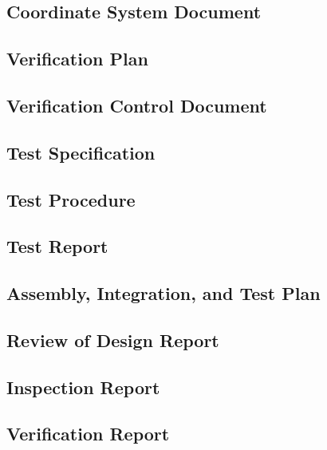 \subsection{Coordinate System Document}
\label{app:Coordinate System Document}


\subsection{Verification Plan}
\label{app:Verification Plan}


\subsection{Verification Control Document}
\label{app:Verification Control Document}


\subsection{Test Specification}
\label{app:Test Specification}


\subsection{Test Procedure}
\label{app:Test Procedure}


\subsection{Test Report}
\label{app:Test Report}


\subsection{Assembly, Integration, and Test Plan}
\label{app:Assembly, Integration, and Test Plan}


\subsection{Review of Design Report}
\label{app:Review of Design Report}


\subsection{Inspection Report}
\label{app:Inspection Report}


\subsection{Verification Report}
\label{app:Verification Report}


